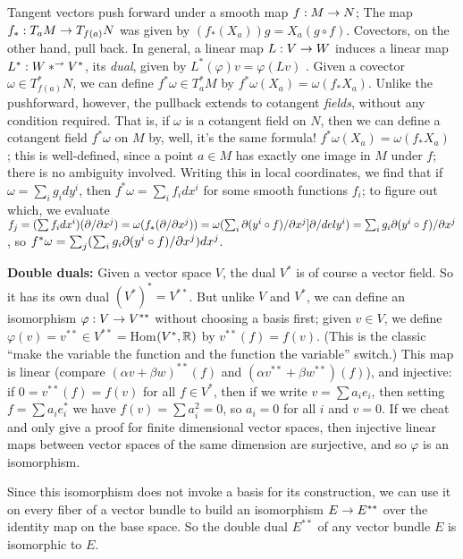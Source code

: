 \msk

Tangent vectors push forward under a smooth map $f:M\rightarrow N$; The map $f_*:T_aM\rightarrow T_{f(a)}N$
was given by 
$(f_*(X_a))g=X_a(g\circ f)$. Covectors, on the other hand, pull back. In general, a linear map
$L:V\rightarrow W$ induces a linear map $L^*:W*^\rightarrow V^*$, its {\it dual}, given by $L^*(\varphi)v =\varphi(Lv)$ . 
Given a covector $\omega\in T^*_{f(a)}N$, we can define $f^*\omega\in T^*_aM$ by
$f^*\omega(X_a)=\omega(f_*X_a)$. Unlike the pushforward, however, the pullback extends to cotangent
{\it fields}, without any condition required. That is, if $\omega$ is a cotangent field on $N$, then 
we can define a cotangent field $f^*\omega$ on $M$ by, well, it's the same formula!
$f^*\omega(X_a)=\omega(f_*X_a)$ ; this is well-defined, since a point $a\in M$ has exactly one
image in $M$ under $f$; there is no ambiguity involved. Writing this in local coordinates, we find
that if $\omega=\sum_i g_i dy^i$, then 
$f^*\omega=\sum_i f_i dx^i$ for some smooth functions $f_i$; to figure out which, we
evaluate $f_j=(\sum f_i dx^i)(\partial/\partial x^j)=
\omega(f_*(\partial/\partial x^j))=\omega(\sum_i\partial(y^i\circ f)/\partial x^j]\partial/del y^i)
=\sum_i g_i\partial(y^i\circ f)/\partial x^j$, so $f^*\omega=\sum_j(\sum_i g_i\partial(y^i\circ f)/\partial x^j)dx^j$.

\msk

{\bf Double duals:} Given a vector space $V$, the dual $V^*$ is of course a vector field. So
it has its own dual $(V^*)^*=V^{**}$. But unlike $V$ and $V^*$, we can define an isomorphism
$\varphi:V\rightarrow V^{**}$ without choosing a basis first; given $v\in V$, we define $\varphi(v)=v^{**}\in
V^{**}=$Hom$(V^*,{\Bbb R})$ by $v^{**}(f)=f(v)$. (This is the classic ``make the variable the function
and the function the variable'' switch.) This map is linear (compare $(\alpha v+\beta w)^{**}(f)$
and $(\alpha v^{**}+\beta w^{**})(f)$), and injective: if $0=v^{**}(f)=f(v)$ for all $f\in V^*$,
then if we write $v=\sum a_ie_i$, then setting $f=\sum a_i e_i^*$ we have 
$f(v)=\sum a_i^2=0$, so $a_i=0$ for all $i$ and $v=0$. If we cheat and only give a proof for 
finite dimensional vector spaces, then injective linear maps between vector spaces of the same dimension
are surjective, and so $\varphi$ is an isomorphism.

Since this isomorphism does not invoke a basis for its construction, we can use it on every fiber of 
a vector bundle to build an isomorphism $E\rightarrow E^{**}$ over the identity map on the base space.
So the double dual $E^{**}$ of any vector bundle $E$ is isomorphic to $E$. 

